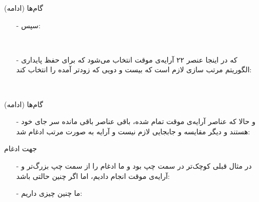 \begin{frame}{گام‌ها (ادامه)}
\begin{itemize}\itemr
\item[-]
سپس:
\begin{lfl}
\\
\end{lfl}

\item[-]
که در اینجا عنصر ۲۲ آرایه‌ی موقت انتخاب می‌شود که برای حفظ پایداری الگوریتم مرتب‌ سازی لازم است که بیست و دویی که زودتر آمده را انتخاب کند:
\begin{lfl}
\\
\end{lfl}
\end{itemize}
\end{frame}

\begin{frame}{گام‌ها (ادامه)}
\begin{itemize}\itemr
\item[-]
و حالا که عناصر آرایه‌ی موقت تمام شده، باقی عناصر باقی مانده سر جای خود هستند و دیگر مقایسه و جابجایی لازم نیست و آرایه به صورت مرتب ادغام شد:

\begin{lfl}
\end{lfl}
\end{itemize}
\end{frame}

\begin{frame}{جهت ادغام}
\begin{itemize}\itemr
\item[-]
در مثال قبلی  کوچک‌تر در سمت چپ بود و ما ادغام را از سمت چپ  بزرگ‌تر و آرایه‌ی موقت انجام دادیم، اما اگر چنین حالتی باشد:
\begin{lfl}
\end{lfl}

\item[-]
ما چنین چیزی داریم:
\begin{lfl}
\\
\end{lfl}
\end{itemize}
\end{frame}

